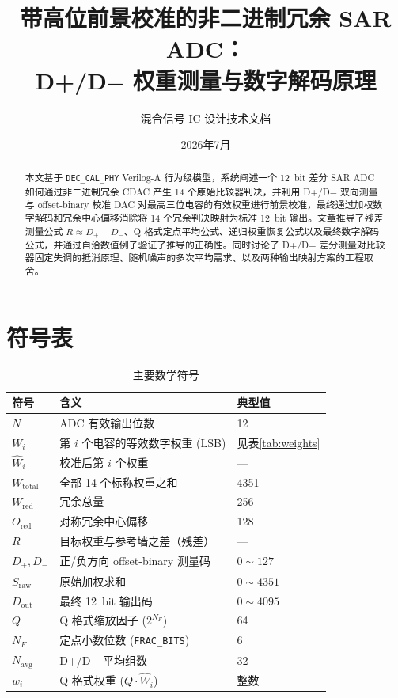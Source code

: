 \documentclass[
  UTF8,
  a4paper,
  11pt,
  oneside,
  fontset=fandol
]{ctexrep}
\title{\textbf{带高位前景校准的非二进制冗余 SAR ADC：\\[4pt]
D+/D$-$ 权重测量与数字解码原理}}
\author{混合信号 IC 设计技术文档}
\date{2026年7月}
\newcommand{\code}[1]{\texttt{#1}}
\newcommand{\What}{\widehat{W}}
\newcommand{\Wtotal}{W_{\mathrm{total}}}
\newcommand{\Wred}{W_{\mathrm{red}}}
\newcommand{\Ored}{O_{\mathrm{red}}}
\newcommand{\Sraw}{S_{\mathrm{raw}}}
\newcommand{\Dout}{D_{\mathrm{out}}}
\begin{document}
\maketitle

\begin{abstract}
\noindent
本文基于 \code{DEC\_CAL\_PHY} Verilog-A 行为级模型，系统阐述一个 \SI{12}{bit} 差分 SAR ADC 如何通过非二进制冗余 CDAC 产生 14 个原始比较器判决，并利用 D+/D$-$ 双向测量与 offset-binary 校准 DAC 对最高三位电容的有效权重进行前景校准，最终通过加权数字解码和冗余中心偏移消除将 14 个冗余判决映射为标准 \SI{12}{bit} 输出。文章推导了残差测量公式 $R \approx D_+ - D_-$、Q 格式定点平均公式、递归权重恢复公式以及最终数字解码公式，并通过自洽数值例子验证了推导的正确性。同时讨论了 D+/D$-$ 差分测量对比较器固定失调的抵消原理、随机噪声的多次平均需求、以及两种输出映射方案的工程取舍。
\end{abstract}

\bigskip

\tableofcontents
\newpage

\section*{符号表}

\begin{table}[H]
\centering
\caption{主要数学符号}
\label{tab:symbols}
\small
\begin{tabularx}{\textwidth}{l l X}
\toprule
符号 & 含义 & 典型值 \\
\midrule
$N$ & ADC 有效输出位数 & 12 \\
$W_i$ & 第 $i$ 个电容的等效数字权重 (LSB) & 见表\ref{tab:weights} \\
$\What_i$ & 校准后第 $i$ 个权重 & --- \\
$\Wtotal$ & 全部 14 个标称权重之和 & 4351 \\
$\Wred$ & 冗余总量 & 256 \\
$\Ored$ & 对称冗余中心偏移 & 128 \\
$R$ & 目标权重与参考墙之差（残差） & --- \\
$D_+, D_-$ & 正/负方向 offset-binary 测量码 & $0 \sim 127$ \\
$\Sraw$ & 原始加权求和 & $0 \sim 4351$ \\
$\Dout$ & 最终 \SI{12}{bit} 输出码 & $0 \sim 4095$ \\
$Q$ & Q 格式缩放因子 ($2^{N_F}$) & 64 \\
$N_F$ & 定点小数位数 (\code{FRAC\_BITS}) & 6 \\
$N_{\mathrm{avg}}$ & D+/D$-$ 平均组数 & 32 \\
$w_i$ & Q 格式权重 ($Q \cdot \What_i$) & 整数 \\
\bottomrule
\end{tabularx}
\end{table}
\end{document}
